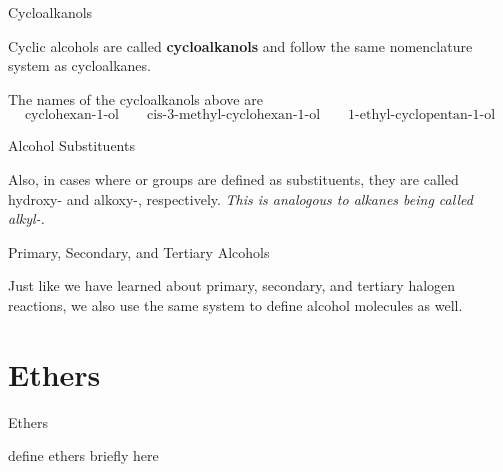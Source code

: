 \documentclass[10pt]{article}
\begin{document}
  \begin{core}{Cycloalkanols}

    Cyclic alcohols are called \textbf{cycloalkanols} and follow the same nomenclature system as cycloalkanes. 


    The names of the cycloalkanols above are 
    \[
        \text{cyclohexan-1-ol}\qquad\text{cis-3-methyl-cyclohexan-1-ol}\qquad\text{1-ethyl-cyclopentan-1-ol}
    \]

  \end{core}

  \begin{core}{Alcohol Substituents}

    Also, in cases where  or  groups are defined as substituents, they are called hydroxy- and alkoxy-, respectively. \textit{This is analogous to alkanes being called alkyl-.}

  \end{core}

  \begin{core}{Primary, Secondary, and Tertiary Alcohols}

    Just like we have learned about primary, secondary, and tertiary halogen reactions, we also use the same system to define alcohol molecules as well.


  \end{core}

\section{Ethers}

  \begin{core}{Ethers}

    define ethers briefly here

  \end{core}
\end{document}
